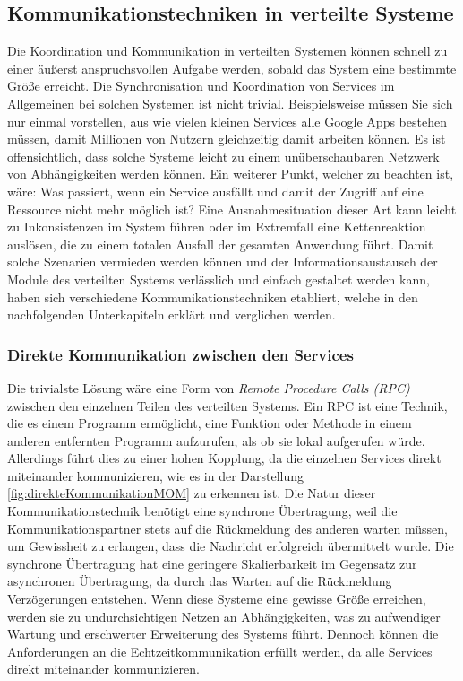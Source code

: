 \subsection{Kommunikationstechniken in verteilte Systeme}
\label{kommunikationstechnikenInVerteilteSysteme}

Die Koordination und Kommunikation in verteilten Systemen können schnell zu einer äußerst anspruchsvollen Aufgabe werden, sobald das System eine bestimmte Größe erreicht. Die Synchronisation und Koordination von Services im Allgemeinen bei solchen Systemen ist nicht trivial. Beispielsweise müssen Sie sich nur einmal vorstellen, aus wie vielen kleinen Services alle Google Apps bestehen müssen, damit Millionen von Nutzern gleichzeitig damit arbeiten können. Es ist offensichtlich, dass solche Systeme leicht zu einem unüberschaubaren Netzwerk von Abhängigkeiten werden können. Ein weiterer Punkt, welcher zu beachten ist, wäre: Was passiert, wenn ein Service ausfällt und damit der Zugriff auf eine Ressource nicht mehr möglich ist? Eine Ausnahmesituation dieser Art kann leicht zu Inkonsistenzen im System führen oder im Extremfall eine Kettenreaktion auslösen, die zu einem totalen Ausfall der gesamten Anwendung führt. Damit solche Szenarien vermieden werden können und der Informationsaustausch der Module des verteilten Systems verlässlich und einfach gestaltet werden kann, haben sich verschiedene Kommunikationstechniken etabliert, welche in den nachfolgenden Unterkapiteln erklärt und verglichen werden. \cite{google2009services}

\subsubsection{Direkte Kommunikation zwischen den Services}

Die trivialste Lösung wäre eine Form von \emph{Remote Procedure Calls (RPC)} zwischen den einzelnen Teilen des verteilten Systems. Ein RPC ist eine Technik, die es einem Programm ermöglicht, eine Funktion oder Methode in einem anderen entfernten Programm aufzurufen, als ob sie lokal aufgerufen würde. Allerdings führt dies zu einer hohen Kopplung, da die einzelnen Services direkt miteinander kommunizieren, wie es in der Darstellung \ref{fig:direkteKommunikationMOM} zu erkennen ist. 
Die Natur dieser Kommunikationstechnik benötigt eine synchrone Übertragung, weil die Kommunikationspartner stets auf die Rückmeldung des anderen warten müssen, um Gewissheit zu erlangen, dass die Nachricht erfolgreich übermittelt wurde. Die synchrone Übertragung hat eine geringere Skalierbarkeit im Gegensatz zur asynchronen Übertragung, da durch das Warten auf die Rückmeldung Verzögerungen entstehen.    
Wenn diese Systeme eine gewisse Größe erreichen, werden sie zu undurchsichtigen Netzen an Abhängigkeiten, was zu aufwendiger Wartung und erschwerter Erweiterung des Systems führt. Dennoch können die Anforderungen an die Echtzeitkommunikation erfüllt werden, da alle Services direkt miteinander kommunizieren.
\cite{toshevLearningRabbitMQBuild2016,curryMessageOrientedMiddleware2004}

